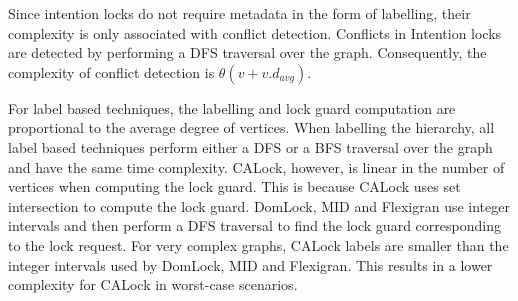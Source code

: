 Since intention locks do not require metadata in the form of labelling, their complexity is only associated with conflict detection. Conflicts in Intention locks are detected by performing a DFS traversal over the graph. Consequently, the complexity of conflict detection is $\theta(v+ {v}.{d_{avg}})$.

For label based techniques, the labelling and lock guard computation are proportional to the average degree of vertices. When labelling the hierarchy, all label based techniques perform either a DFS or a BFS traversal over the graph and have the same time complexity.
CALock, however, is linear in the number of vertices when computing the lock guard. This is because CALock uses set intersection to compute the lock guard. DomLock, MID and Flexigran use integer intervals and then perform a DFS traversal to find the lock guard corresponding to the lock request. For very complex graphs, CALock labels are smaller than the integer intervals used by DomLock, MID and Flexigran. This results in a lower complexity for CALock in worst-case scenarios.





	
